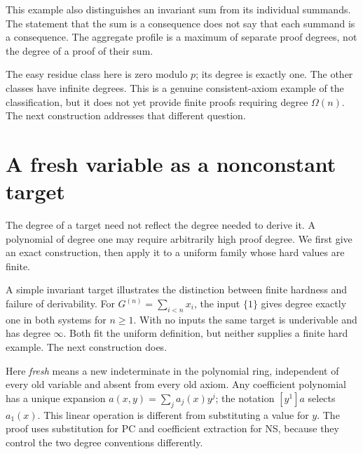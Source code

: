 This example also distinguishes an invariant sum from its individual
summands. The statement that the sum is a consequence does not say
that each summand is a consequence. The aggregate profile is a maximum
of separate proof degrees, not the degree of a proof of their sum.

The easy residue class here is zero modulo $p$; its degree is exactly
one. The other classes have infinite degrees. This is a genuine
consistent-axiom example of the classification, but it does not yet
provide finite proofs requiring degree $\Omega(n)$. The next
construction addresses that different question.

\section{A fresh variable as a nonconstant target}\label{tx:sec:target-examples}
The degree of a target need not reflect the degree needed to derive it.
A polynomial of degree one may require arbitrarily high proof degree.
We first give an exact construction, then apply it to a uniform family
whose hard values are finite.

A simple invariant target illustrates the distinction between finite
hardness and failure of derivability. For $G^{(n)}=\sum_{i<n}x_i$, the input
$\{1\}$ gives degree exactly one in both systems for $n\ge1$. With no
inputs the same target is underivable and has degree $\infty$. Both
fit the uniform definition, but neither supplies a finite hard example.
The next construction does.

Here \emph{fresh} means a new indeterminate in the polynomial ring,
independent of every old variable and absent from every old axiom.
Any coefficient polynomial has a unique expansion
$a(x,y)=\sum_j a_j(x)y^j$; the notation $[y^1]a$ selects $a_1(x)$.
This linear operation is different from substituting a value for $y$.
The proof uses substitution for PC and coefficient extraction for NS,
because they control the two degree conventions differently.


